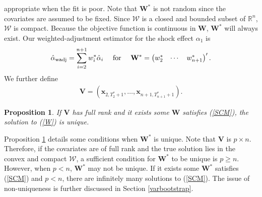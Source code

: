 \documentclass[11pt]{article}
\def\mbf#1{\mathbf{#1}} %
\newcommand{\reals}{\mathbb{R}} %
\def\mc#1{\mathcal{#1}} %
\newtheorem{prop}{Proposition}
\theoremstyle{definition}
\begin{document}
appropriate when the fit is poor. 
Note that $\mbf{W}^*$ is not random since the covariates are assumed to be fixed. Since $\mc{W}$ is a closed and bounded subset of $\reals^n$,  $\mc{W}$ is compact. Because the objective function 
is continuous in $\mbf{W}$, $\mbf{W}^*$ will always exist. %
Our weighted-adjustment estimator for the shock effect $\alpha_1$ is
  \begin{align*}
    \hat{\alpha}_{\rm wadj} = \sum_{i=2}^{n+1} w_i^*\hat{\alpha}_i
    \quad \text{ for } \quad \mbf{W}^* = \begin{pmatrix}
      w^*_2 & \cdots & w^*_{n+1}
    \end{pmatrix}'.
  \end{align*}
 We further define
\begin{align*}
  \mathbf{V} = (\mathbf{x}_{2, T_2^*+1}, \ldots,\mathbf{x}_{n+1, T_{n+1}^*+1}).
\end{align*}
\begin{prop}
  \label{uniqueness} If $\mathbf{V}$ has full rank and it exists some $\mathbf{W}$ satisfies (\ref{SCM}), the solution to  (\ref{W}) is unique.
\end{prop} 
Proposition \ref{uniqueness} details some conditions when $\mathbf{W}^*$ is unique.  Note that $\mathbf{V}$ is $p \times n$. Therefore, if the covariates are of full rank and the true solution lies in the convex and compact $\mathcal{W}$, a sufficient condition for $\mathbf{W}^*$ to be unique is $p \geq n$. However, when $p < n$, $\mathbf{W}^*$ may not be unique. If it exists some $\mathbf{W}^*$ satisfies (\ref{SCM}) and $p < n$, there are infinitely many solutions to (\ref{SCM}).  The issue of non-uniqueness is further discussed in Section \ref{varbootstrap}.
\end{document}
